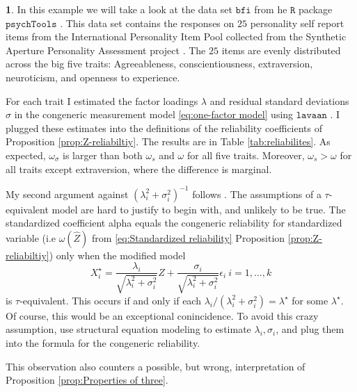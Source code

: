 \documentclass{article}
\theoremstyle{plain}
\theoremstyle{plain}
\theoremstyle{definition}
\theoremstyle{remark}
\theoremstyle{definition}
\newtheorem{example}[thm]{\protect\examplename}
\theoremstyle{plain}
\theoremstyle{plain}
\theoremstyle{definition}
\providecommand{\examplename}{Example}
\begin{document}
\begin{example}


In this example we will take a look at the data set $\texttt{bfi}$ from he $\texttt{R}$ \citep{Team2013-tt} package $\texttt{psychTools}$ \citep{Revelle2019-te}. This data set contains the responses on $25$ personality self report items from the International Personality Item Pool \citep{Goldberg1999-iz} collected from the Synthetic Aperture Personality Assessment project \citep{Revelle2016-ez}. The $25$ items are evenly distributed across the big five traits: Agreeableness, conscientiousness, extraversion, neuroticism, and openness to experience. 

For each trait I estimated the factor loadings $\lambda$ and residual standard deviations $\sigma$ in the congeneric measurement model \eqref{eq:one-factor model} using  $\texttt{lavaan}$ \citep{Rosseel2012-yg}. I plugged these estimates into the definitions of the reliability coefficients of Proposition \ref{prop:Z-reliabiltiy}. The results are in Table \ref{tab:reliabilites}. As expected, $\omega_\sigma$ is larger than both $\omega_s$ and $\omega$ for all five traits. Moreover, $\omega_s > \omega$ for all traits except extraversion, where the difference is marginal. 
\end{example}

My second argument against $(\lambda_{i}^{2}+\sigma_{i}^{2})^{-1}$
follows \citep{Falk2011-ae}. The assumptions of a $\tau$-equivalent model are hard
to justify to begin with, and unlikely to be true. The standardized
coefficient alpha equals the congeneric reliability for standardized
variable (i.e $\omega\left(\widehat{Z}\right)$ from \eqref{eq:Standardized reliability}
Proposition \ref{prop:Z-reliabiltiy}) only when the modified model
\[
X_{i}^{\star}=\frac{\lambda_{i}}{\sqrt{\lambda_{i}^{2}+\sigma_{i}^{2}}}Z+\frac{\sigma_{i}}{\sqrt{\lambda_{i}^{2}+\sigma_{i}^{2}}}\epsilon_{i}\:i=1,\ldots,k
\]
is $\tau$-equivalent. This occurs if and only if each $\lambda_{i}/(\lambda_{i}^{2}+\sigma_{i}^{2})=\lambda^{\star}$
for some $\lambda^{\star}$. Of course, this would be an exceptional
conincidence. To avoid this crazy assumption, use structural equation
modeling to estimate $\lambda_{i},\sigma_{i}$, and plug them into
the formula for the congeneric reliability.

This observation also counters a possible, but wrong, interpretation
of Proposition \ref{prop:Properties of three}.
\end{document}
